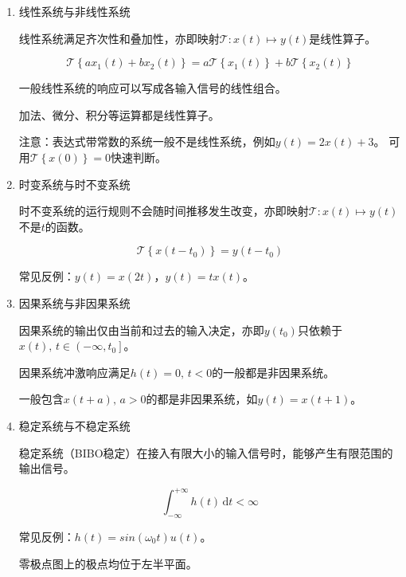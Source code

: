 \documentclass[UTF8,fontset=fandol,zihao=5]{ctexart}
\newcommand{\dd}{\,\mathrm{d}}
\begin{document}
\begin{enumerate}
  
  \item 线性系统与非线性系统
  
  线性系统满足齐次性和叠加性，亦即映射$\mathcal{T} : x(t) \mapsto y(t)$是线性算子。
  
  \begin{methodbox}[线性系统的判定]
  
    \[\mathcal{T}\left\{ax_1(t) + bx_2(t)\right\} = a\mathcal{T}\left\{x_1(t)\right\} + b\mathcal{T}\left\{x_2(t)\right\}\]
  
  一般线性系统的响应可以写成各输入信号的线性组合。

  加法、微分、积分等运算都是线性算子。
  
  注意：表达式带常数的系统一般不是线性系统，例如$y(t)=2x(t)+3$。
  可用$\mathcal{T}\left\{x(0)\right\}=0$快速判断。
  
  \end{methodbox}

  \item 时变系统与时不变系统
  
  时不变系统的运行规则不会随时间推移发生改变，亦即映射$\mathcal{T} : x(t) \mapsto y(t)$不是$t$的函数。

  \begin{methodbox}[时不变系统的判定]
    \[\mathcal{T}\left\{x(t-t_0)\right\} = y(t-t_0)\]
    
    常见反例：$y(t)=x(2t)$，$y(t)=tx(t)$。
  \end{methodbox}

  \item 因果系统与非因果系统
  
  因果系统的输出仅由当前和过去的输入决定，亦即$y(t_0)$只依赖于$x(t), \, t \in \left ( -\infty, t_0 \right ]$。

  \begin{methodbox}[因果系统的判定]
    因果系统冲激响应满足$h(t)=0,\, t<0$的一般都是非因果系统。
    
    一般包含$x(t+a),\, a>0$的都是非因果系统，如$y(t)=x(t+1)$。
  \end{methodbox}

  \item 稳定系统与不稳定系统

  稳定系统（BIBO稳定）在接入有限大小的输入信号时，能够产生有限范围的输出信号。

  \begin{methodbox}[稳定系统的判定]
    \[\int_{-\infty}^{+\infty} h(t) \dd t < \infty\]
    
    常见反例：$h(t)=sin(\omega_0 t)u(t)$。
  \end{methodbox}

  \begin{methodbox}[因果稳定系统的判定]
    零极点图上的极点均位于左半平面。
  \end{methodbox}

\end{enumerate}
\end{document}
